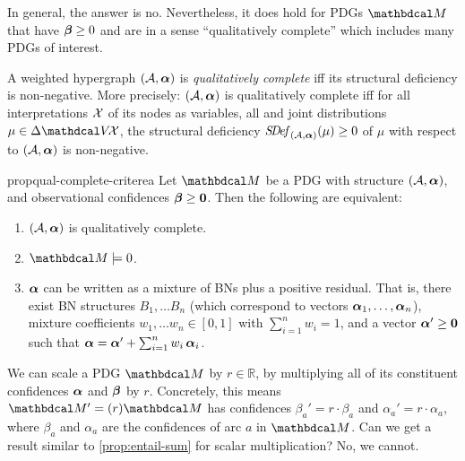 In general, the answer is no.
Nevertheless, it does hold for PDGs $\dg M$ that have $\boldsymbol\beta \ge 0$ and are in a sense ``qualitatively complete'' 
which includes many PDGs of interest. 
    
\begin{defn}\label{defn:qual-complete}
    A weighted hypergraph $(\mathcal A, \boldsymbol\alpha)$ is \emph{qualitatively complete}
    iff its structural deficiency is non-negative.
    More precisely: $(\mathcal A, \boldsymbol\alpha)$ is qualitatively complete iff
    for all interpretations $\mathcal X$ of its nodes as variables,
    all and joint distributions $\mu \in \Delta\V\!\X$, 
    the structural deficiency $\mathit{S\mskip-3.5muD\mskip-2.5mue\mskip-1.5muf}_{(\mathcal A, \boldsymbol\alpha)}(\mu) \ge 0$
    of $\mu$ with respect to $(\mathcal A, \boldsymbol\alpha)$ is non-negative. 
\end{defn}

\begin{linked}{prop}{qual-complete-criterea}
Let $\dg M$ be a PDG with structure $(\mathcal A,\boldsymbol\alpha)$,
    and observational confidences $\boldsymbol\beta \ge \mathbf 0$.
Then the following are equivalent:
\begin{enumerate}[parsep=0ex]
    \item $(\mathcal A, \boldsymbol\alpha)$ is qualitatively complete. 
    \item $\dg M \models 0$.
    \item 
    $\boldsymbol\alpha$
    can be written as a mixture of BNs plus a positive residual.
    That is, there exist BN structures $B_1, \ldots B_n$ 
    (which correspond to vectors $\boldsymbol\alpha_1, \ldots, \boldsymbol\alpha_n$), mixture coefficients
    $w_1, \ldots w_n \in [0,1]$ with $\sum_{i=1}^n w_i = 1$, and a vector
    $\boldsymbol\alpha' \ge \mathbf 0$ such that $\boldsymbol\alpha = \boldsymbol\alpha' + \sum_{i=1}^n w_i \,\boldsymbol\alpha_i$. 
\end{enumerate}
\end{linked}




We can scale a PDG $\dg M$ by $r \in \mathbb R$, by multiplying
all of its constituent confidences $\boldsymbol\alpha$ and $\boldsymbol\beta$ by $r$. 
Concretely, this means $\dg M' = (r) \dg M$
has confidences $\beta_a' = r \cdot \beta_a$ and $\alpha_a' = r \cdot \alpha_a$,
where $\beta_a$ and $\alpha_a$ are the confidences of arc $a$ in $\dg M$. 
Can we get a result similar to \cref{prop:entail-sum}
    for scalar multiplication? 
No, we cannot.

